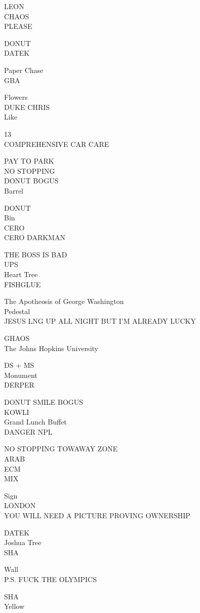 \documentclass[10pt,letterpaper]{article}
\begin{document}
LEON\\
CHAOS\\
PLEASE

DONUT\\
DATEK

Paper Chase\\
GBA

Flowers\\
DUKE CHRIS\\
Like

13\\
COMPREHENSIVE CAR CARE

PAY TO PARK\\
NO STOPPING\\
DONUT BOGUS\\
Barrel

DONUT\\
Bin\\
CERO\\
CERO DARKMAN

THE BOSS IS BAD\\
UPS\\
Heart Tree\\
FISHGLUE

The Apotheosis of George Washington\\
Pedestal\\
JESUS LNG UP ALL NIGHT BUT I'M ALREADY LUCKY

GHAOS\\
The Johns Hopkins University

DS + MS\\
Monument\\
DERPER

DONUT SMILE BOGUS\\
KOWLI\\
Grand Lunch Buffet\\
DANGER NPL

NO STOPPING TOWAWAY ZONE\\
ARAB\\
ECM\\
MIX

Sign\\
LONDON\\
YOU WILL NEED A PICTURE PROVING OWNERSHIP

DATEK\\
Joshua Tree\\
SHA

Wall\\
P.S. FUCK THE OLYMPICS

SHA\\
Yellow
\end{document}
